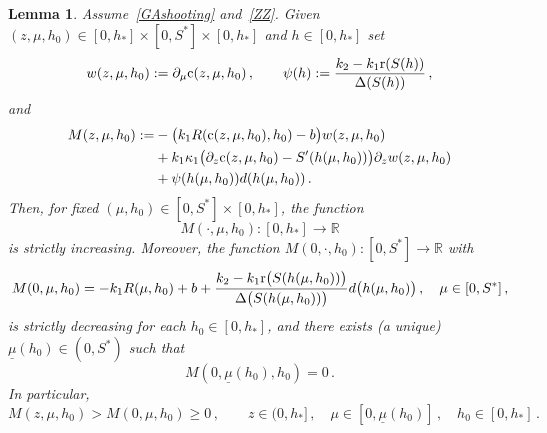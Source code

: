 \documentclass[reqno,11pt]{amsart}
\newtheorem{lem}[thm]{Lemma}
\numberwithin{equation}{section}
\newcommand{\R}{\mathbb{R}}
\begin{document}
\begin{lem}\label{L22}
Assume~\eqref{GAshooting} and~\eqref{ZZ}.  Given $(z,\mu,h_0)\in [0,h_*]\times [0,S^*]\times [0,h_*]$ and $h\in [0,h_*]$ set
\[
w(z,\mu,h_0):=\partial_\mu{\rm c}(z,\mu,h_0)\,,\qquad
\psi(h):=\frac{k_2-k_1{\rm r}(S(h))}{\Delta(S(h))}\,,
\]
and
\begin{equation}\label{Mdef}
\begin{aligned}
M(z,\mu,h_0):=&-\big(k_1 R({\rm c}(z,\mu,h_0),h_0)-b\big)w(z,\mu,h_0)\\
&+k_1\kappa_1\big(\partial_z{\rm c}(z,\mu,h_0)-S'(h(\mu,h_0))\big)\partial_z w(z,\mu,h_0)\\
&+\psi(h(\mu,h_0))d(h(\mu,h_0))\,.
\end{aligned}
\end{equation}
Then, for fixed $(\mu,h_0)\in [0,S^*]\times [0,h_*]$, the function
$$
M(\cdot,\mu,h_0):[0,h_*]\to \R
$$ 
is strictly increasing. Moreover, the function
$M(0,\cdot,h_0):[0,S^*]\to\R$ with
\begin{equation}\label{M0}
M(0,\mu,h_0)=- k_1 R(\mu,h_0)+b +\frac{k_2-k_1{\rm r}\big(S(h(\mu,h_0))\big)}{\Delta\big(S(h(\mu,h_0))\big)}d\big(h(\mu,h_0)\big)\,,\quad \mu\in [0,S^*]\,,
\end{equation}
is strictly decreasing for each $h_0\in [0,h_*]$, and there exists (a unique) $\underline{\mu}(h_0)\in (0,S^*)$ such that 
$$
M(0,\underline{\mu}(h_0),h_0)=0\,.
$$ 
In particular,
\begin{equation}\label{M}
M(z,\mu,h_0)> M(0,\mu,h_0)\ge 0\,,\qquad z\in (0,h_*]\,,\quad \mu\in [0,\underline{\mu}(h_0)]\,,\quad h_0\in [0,h_*] \,.
\end{equation}
\end{lem}
\end{document}
